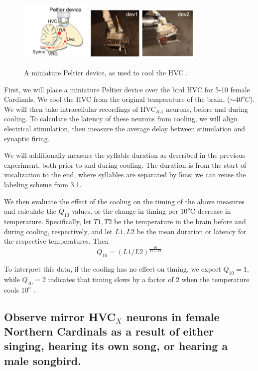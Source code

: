 \documentclass[12pt]{article}
\begin{document}
\begin{figure}[ht]
\centering
\includegraphics[width=0.3\textwidth]{hvc_peltier.png}
\includegraphics[width=0.5\textwidth]{irl_peltier.png}
\caption{\label{fig:peltier} A miniature Peltier device, as used to cool the HVC \cite{Hamaguchi}.}
\end{figure}

First, we will place a miniature Peltier device over the bird HVC for 5-10 female Cardinals. We cool the HVC from the original temperature of the brain, ($\sim 40^{o}C$). We will then take intracellular recordings of HVC$_{RA}$ neurons, before and during cooling. To calculate the latency of these neurons from cooling, we will align electrical stimulation, then measure the average delay between stimulation and synaptic firing.

We will additionally measure the syllable duration as described in the previous experiment, both prior to and during cooling. The duration is from the start of vocalization to the end, where syllables are separated by 5ms; we can reuse the labeling scheme from 3.1.

We then evaluate the effect of the cooling on the timing of the above measures and calculate the $Q_{10}$ values, or the change in timing per $10^o$C decrease in temperature. Specifically, let $T1, T2$ be the temperature in the brain before and during cooling, respectively, and let $L1, L2$ be the mean duration or latency for the respective temperatures. Then $$Q_{10} = (L1/L2)^{\frac{10}{T2-T1}}$$

To interpret this data, if the cooling has no effect on timing, we expect $Q_{10} = 1$, while $Q_{10} = 2$ indicates that timing slows by a factor of 2 when the temperature cools $10^o$ \cite{Hamaguchi}.

\subsection{Observe mirror HVC$_X$ neurons in female Northern Cardinals as a result of either singing, hearing its own song, or hearing a male songbird.}
\end{document}
